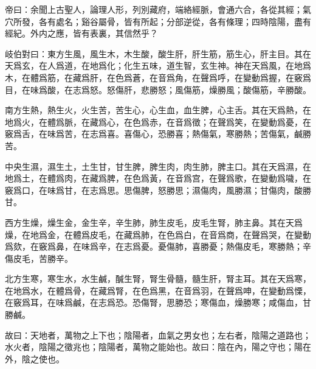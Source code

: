 \documentclass[12pt]{ctexbook}
\begin{document}
\begin{yuanwen}
帝曰：余聞上古聖人，論理人形，列別藏府，端絡經脈，會通六合，各從其經；氣穴所發，各有處名；谿谷屬骨，皆有所起；分部逆從，各有條理；四時陰陽，盡有經紀。外内之應，皆有表裏，其信然乎？

岐伯對曰：東方生風，風生木，木生酸，酸生肝，肝生筋，筋生心，肝主目。其在天爲玄，在人爲道，在地爲化；化生五味，道生智，玄生神。神在天爲風，在地爲木，在體爲筋，在藏爲肝，在色爲蒼，在音爲角，在聲爲呼，在變動爲握，在竅爲目，在味爲酸，在志爲怒。怒傷肝，悲勝怒；風傷筋，燥勝風；酸傷筋，辛勝酸。

南方生熱，熱生火，火生苦，苦生心，心生血，血生脾，心主舌。其在天爲熱，在地爲火，在體爲脈，在藏爲心，在色爲赤，在音爲徵；在聲爲笑，在變動爲憂，在竅爲舌，在味爲苦，在志爲喜。喜傷心，恐勝喜；熱傷氣，寒勝熱；苦傷氣，鹹勝苦。

中央生濕，濕生土，土生甘，甘生脾，脾生肉，肉生肺，脾主口。其在天爲濕，在地爲土，在體爲肉，在藏爲脾，在色爲黃，在音爲宫，在聲爲歌，在變動爲噦，在竅爲口，在味爲甘，在志爲思。思傷脾，怒勝思；濕傷肉，風勝濕；甘傷肉，酸勝甘。

西方生燥，燥生金，金生辛，辛生肺，肺生皮毛，皮毛生腎，肺主鼻。其在天爲燥，在地爲金，在體爲皮毛，在藏爲肺，在色爲白，在音爲商，在聲爲哭，在變動爲欬，在竅爲鼻，在味爲辛，在志爲憂。憂傷肺，喜勝憂；熱傷皮毛，寒勝熱；辛傷皮毛，苦勝辛。

北方生寒，寒生水，水生鹹，醎生腎，腎生骨髓，髓生肝，腎主耳。其在天爲寒，在地爲水，在體爲骨，在藏爲腎，在色爲黑，在音爲羽，在聲爲呻，在變動爲慄，在竅爲耳，在味爲鹹，在志爲恐。恐傷腎，思勝恐；寒傷血，燥勝寒；咸傷血，甘勝鹹。

故曰：天地者，萬物之上下也；陰陽者，血氣之男女也；左右者，陰陽之道路也；水火者，陰陽之徵兆也；陰陽者，萬物之能始也。故曰：陰在內，陽之守也；陽在外，陰之使也。
\end{yuanwen}

\end{document}
